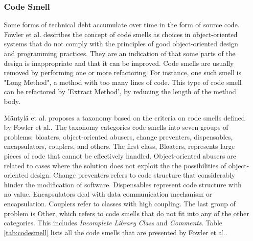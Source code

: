 \subsubsection{Code Smell}
\label{subsub:codesmell}
Some forms of technical debt accumulate over time in the form of source code\cite{zazworka2014comparing}. Fowler et al.\cite{fowler1999refactoring} describes the concept of code smells as choices in object-oriented systems that do not comply with the principles of good object-oriented design and programming practices. They are an indication of that some parts of the design is inappropriate and that it can be improved. Code smells are usually removed by performing one or more refactoring\cite{fowler1999refactoring}. For instance, one such smell is "Long Method", a method with too many lines of code. This type of code smell can be refactored by 'Extract Method', by reducing the length of the method body\cite{fowler1999refactoring}. 

Mäntylä et al.\cite{mantyla2003taxonomy} proposes a taxonomy based on the criteria on code smells defined by Fowler et al.\cite{fowler1999refactoring}. The taxonomy categories code smells into seven groups of problems: bloaters, object-oriented abusers, change preventers, dispensables, encapsulators, couplers, and others. The first class, Bloaters, represents large pieces of code that cannot be effectively handled. Object-oriented abusers are related to cases where the solution does not exploit the the possibilities of object-oriented design. Change preventers refers to code structure that considerably hinder the modification of software. Dispensables represent code structure with no value. Encapsulators deal with data communication mechanism or encapsulation. Couplers refer to classes with high coupling. The last group of problem is Other, which refers to code smells that do not fit into any of the other categories. This includes \textit{Incomplete Library Class} and \textit{Comments}. Table \ref{tab:codesmell} lists all the code smells that are presented by Fowler et al.\cite{fowler1999refactoring}.



